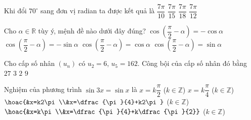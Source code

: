\begin{ex}%
	Khi đổi $70^{\circ}$ sang đơn vị radian ta được kết quả là
	\choice
	{$\dfrac{7\pi}{10}$}
	{$\dfrac{7\pi}{15}$}
	{\True $\dfrac{7\pi}{18}$}
	{$\dfrac{7\pi}{12}$}
\end{ex}
\begin{ex}%
	Cho $\alpha\in\mathbb{R}$ tùy ý, mệnh đề nào dưới đây đúng?
	\choice
	{$\cos\left(\dfrac{\pi}{2}-\alpha\right)=-\cos\alpha$}
	{$\cos\left(\dfrac{\pi}{2}-\alpha\right)=-\sin\alpha$}
	{$\cos\left(\dfrac{\pi}{2}-\alpha\right)=\cos\alpha$}
	{\True $\cos\left(\dfrac{\pi}{2}-\alpha\right)=\sin\alpha$}
\end{ex}
\begin{ex}%
	Cho cấp số nhân $(u_n)$ có $u_2=6$, $u_5=162$. Công bội của cấp số nhân đó bằng
	\choice
	{$27$}
	{\True $3$}
	{$2$}
	{$9$}
\end{ex}
\begin{ex}%
	Nghiệm của phương trình $\sin 3x=\sin x$ là
	\choice
	{$x=k\dfrac{\pi}{2}$ ($k\in\mathbb{Z}$)}
	{$x=k\dfrac{\pi}{4}$ ($k\in\mathbb{Z}$)}
	{$\hoac{&x=k2\pi\\&x=\dfrac{\pi}{4}+k2\pi}$ ($k\in\mathbb{Z}$)}
	{\True $\hoac{&x=k\pi\\&x=\dfrac{\pi}{4}+k\dfrac{\pi}{2}}$ ($k\in\mathbb{Z}$)}
\end{ex}
